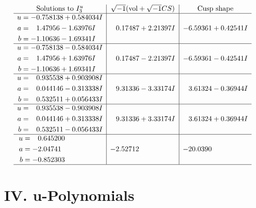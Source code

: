 \documentclass[1p]{elsarticle_modified}
\theoremstyle{definition}
\newcommand{\I}{\sqrt{-1}}
\begin{document}
$$\begin{array}{c|c|c}  
\text{Solutions to }I^u_{3}& \I (\text{vol} + \sqrt{-1}CS) & \text{Cusp shape}\\
 \hline 
\begin{aligned}
u &= -0.758138 + 0.584034 I \\
a &= \phantom{-}1.47956 - 1.63976 I \\
b &= -1.10636 - 1.69341 I\end{aligned}
 & \phantom{-}0.17487 + 2.21397 I & -6.59361 + 0.42541 I \\ \hline\begin{aligned}
u &= -0.758138 - 0.584034 I \\
a &= \phantom{-}1.47956 + 1.63976 I \\
b &= -1.10636 + 1.69341 I\end{aligned}
 & \phantom{-}0.17487 - 2.21397 I & -6.59361 - 0.42541 I \\ \hline\begin{aligned}
u &= \phantom{-}0.935538 + 0.903908 I \\
a &= \phantom{-}0.044146 - 0.313338 I \\
b &= \phantom{-}0.532511 + 0.056433 I\end{aligned}
 & \phantom{-}9.31336 - 3.33174 I & \phantom{-}3.61324 - 0.36944 I \\ \hline\begin{aligned}
u &= \phantom{-}0.935538 - 0.903908 I \\
a &= \phantom{-}0.044146 + 0.313338 I \\
b &= \phantom{-}0.532511 - 0.056433 I\end{aligned}
 & \phantom{-}9.31336 + 3.33174 I & \phantom{-}3.61324 + 0.36944 I \\ \hline\begin{aligned}
u &= \phantom{-}0.645200\phantom{ +0.000000I} \\
a &= -2.04741\phantom{ +0.000000I} \\
b &= -0.852303\phantom{ +0.000000I}\end{aligned}
 & -2.52712\phantom{ +0.000000I} & -20.0390\phantom{ +0.000000I}\\
 \hline 
 \end{array}$$\newpage
\newpage\renewcommand{\arraystretch}{1}
\centering \section*{ IV. u-Polynomials}
\end{document}
